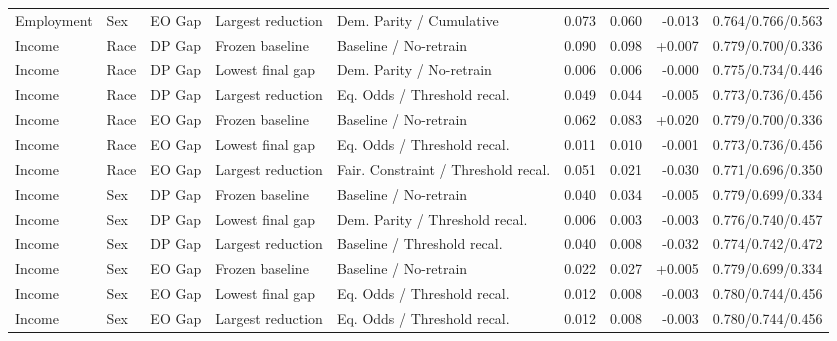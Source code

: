 \begin{table}[H]
\begin{tabular}{lll l p{} rrr l}
Employment & Sex & EO Gap & Largest reduction & Dem. Parity / Cumulative & 0.073 & 0.060 & -0.013 & 0.764/0.766/0.563 \\
Income & Race & DP Gap & Frozen baseline & Baseline / No-retrain & 0.090 & 0.098 & +0.007 & 0.779/0.700/0.336 \\
Income & Race & DP Gap & Lowest final gap & Dem. Parity / No-retrain & 0.006 & 0.006 & -0.000 & 0.775/0.734/0.446 \\
Income & Race & DP Gap & Largest reduction & Eq. Odds / Threshold recal. & 0.049 & 0.044 & -0.005 & 0.773/0.736/0.456 \\
Income & Race & EO Gap & Frozen baseline & Baseline / No-retrain & 0.062 & 0.083 & +0.020 & 0.779/0.700/0.336 \\
Income & Race & EO Gap & Lowest final gap & Eq. Odds / Threshold recal. & 0.011 & 0.010 & -0.001 & 0.773/0.736/0.456 \\
Income & Race & EO Gap & Largest reduction & Fair. Constraint / Threshold recal. & 0.051 & 0.021 & -0.030 & 0.771/0.696/0.350 \\
Income & Sex & DP Gap & Frozen baseline & Baseline / No-retrain & 0.040 & 0.034 & -0.005 & 0.779/0.699/0.334 \\
Income & Sex & DP Gap & Lowest final gap & Dem. Parity / Threshold recal. & 0.006 & 0.003 & -0.003 & 0.776/0.740/0.457 \\
Income & Sex & DP Gap & Largest reduction & Baseline / Threshold recal. & 0.040 & 0.008 & -0.032 & 0.774/0.742/0.472 \\
Income & Sex & EO Gap & Frozen baseline & Baseline / No-retrain & 0.022 & 0.027 & +0.005 & 0.779/0.699/0.334 \\
Income & Sex & EO Gap & Lowest final gap & Eq. Odds / Threshold recal. & 0.012 & 0.008 & -0.003 & 0.780/0.744/0.456 \\
Income & Sex & EO Gap & Largest reduction & Eq. Odds / Threshold recal. & 0.012 & 0.008 & -0.003 & 0.780/0.744/0.456 \\
\bottomrule
\end{tabular}
\end{table}
